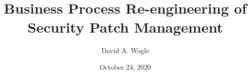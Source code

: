 
\usepackage[utf8]{inputenc}
\usepackage{pgfpages}

\usepackage{palatino}



\title{Business Process Re-engineering of Security Patch Management}
\author{David A. Wagle}
\date{October 24, 2020}
